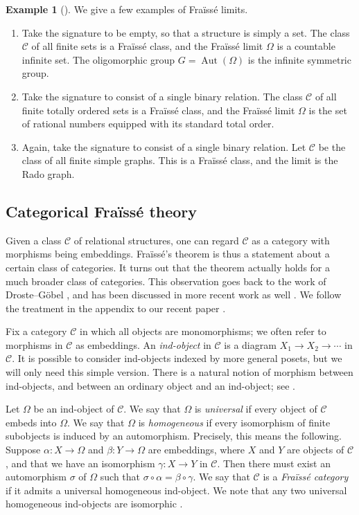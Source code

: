 \documentclass[12pt]{amsart}
\numberwithin{equation}{section}
\theoremstyle{definition}
\newtheorem{eg}[equation]{Example}
\newenvironment{example}[1][]{\begin{eg}[#1] \pushQED{\qed}}{\popQED \end{eg}}
\newcommand{\cC}{\mathcal{C}}
\newcommand{\defn}[1]{\emph{#1}}
\DeclareMathOperator{\Aut}{Aut}
\begin{document}
\begin{example}
We give a few examples of Fra\"iss\'e limits.
\begin{enumerate}
\item Take the signature to be empty, so that a structure is simply a set. The class $\cC$ of all finite sets is a Fra\"iss\'e class, and the Fra\"iss\'e limit $\Omega$ is a countable infinite set. The oligomorphic group $G=\Aut(\Omega)$ is the infinite symmetric group.
\item Take the signature to consist of a single binary relation. The class $\cC$ of all finite totally ordered sets is a Fra\"iss\'e class, and the Fra\"iss\'e limit $\Omega$ is the set of rational numbers equipped with its standard total order.
\item Again, take the signature to consist of a single binary relation. Let $\cC$ be the class of all finite simple graphs. This is a Fra\"iss\'e class, and the limit is the Rado graph. \qedhere
\end{enumerate}
\end{example}

\subsection{Categorical Fra\"iss\'e theory} \label{ss:cat-fraisse}

Given a class $\cC$ of relational structures, one can regard $\cC$ as a category with morphisms being embeddings. Fra\"iss\'e's theorem is thus a statement about a certain class of categories. It turns out that the theorem actually holds for a much broader class of categories. This observation goes back to the work of Droste--G\"obel \cite{DrosteGobel1,DrosteGobel2}, and has been discussed in more recent work as well \cite{Caramello,Irwin,Kubis}. We follow the treatment in the appendix to our recent paper \cite{homoten}.

Fix a category $\cC$ in which all objects are monomorphisms; we often refer to morphisms in $\cC$ as embeddings. An \defn{ind-object} in $\cC$ is a diagram $X_1 \to X_2 \to \cdots$ in $\cC$. It is possible to consider ind-objects indexed by more general posets, but we will only need this simple version. There is a natural notion of morphism between ind-objects, and between an ordinary object and an ind-object; see \cite[\S A.2]{homoten}.

Let $\Omega$ be an ind-object of $\cC$. We say that $\Omega$ is \defn{universal} if every object of $\cC$ embeds into $\Omega$. We say that $\Omega$ is \defn{homogeneous} if every isomorphism of finite subobjects is induced by an automorphism. Precisely, this means the following. Suppose $\alpha \colon X \to \Omega$ and $\beta \colon Y \to \Omega$ are embeddings, where $X$ and $Y$ are objects of $\cC$, and that we have an isomorphism $\gamma \colon X \to Y$ in $\cC$. Then there must exist an automorphism $\sigma$ of $\Omega$ such that $\sigma \circ \alpha = \beta \circ \gamma$. We say that $\cC$ is a \defn{Fra\"iss\'e category} if it admits a universal homogeneous ind-object. We note that any two universal homogeneous ind-objects are isomorphic \cite[Proposition~A.7]{homoten}.
\end{document}
